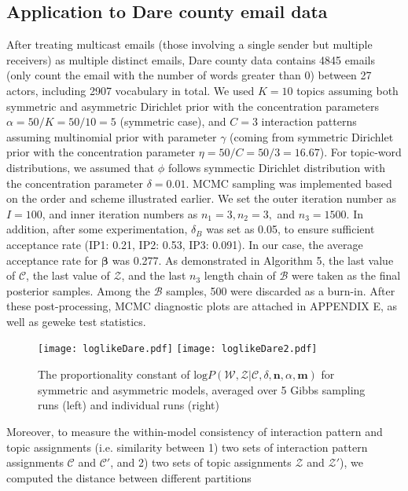 \documentclass[a4paper]{article}
\begin{document}
\subsection{Application to Dare county email data}
After treating multicast emails (those involving a single sender but multiple receivers) as multiple distinct emails, Dare county data contains 4845 emails (only count the email with the number of words greater than 0) between 27 actors, including 2907 vocabulary in total. We used $K=10$ topics assuming both symmetric and asymmetric Dirichlet prior with the concentration parameters $\alpha=50/K=50/10=5$ (symmetric case), and $C=3$ interaction patterns assuming multinomial prior with parameter $\gamma$ (coming from symmetric Dirichlet prior with the concentration parameter $\eta = 50/C=50/3=16.67$). For topic-word distributions, we assumed that $\phi$ follows symmectic Dirichlet distribution with the concentration parameter $\delta=0.01$. MCMC sampling was implemented based on the order and scheme illustrated earlier. We set the outer iteration number as $I=100$, and inner iteration numbers as $n_1=3, n_2=3,$ and $n_3=1500$. In addition, after some experimentation, $\delta_B$ was set as 0.05, to ensure sufficient acceptance rate (IP1: 0.21, IP2: 0.53, IP3: 0.091). In our case, the average acceptance rate for $\boldsymbol{\beta}$ was 0.277. As demonstrated in Algorithm 5, the last value of $\mathcal{C}$, the last value of $\mathcal{Z}$, and the last $n_3$ length chain of $\mathcal{B}$ were taken as the final posterior samples. Among the $\mathcal{B}$ samples, 500 were discarded as a burn-in. After these post-processing, MCMC diagnostic plots are attached in APPENDIX E, as well as geweke test statistics.
\begin{figure}[ht]
	\centering
	\texttt{[image: loglikeDare.pdf]} 
	\texttt{[image: loglikeDare2.pdf]} 
	\caption{The proportionality constant of $\mbox{log}P(\mathcal{W},\mathcal{Z}|\mathcal{C}, \delta, \boldsymbol{n}, \alpha, \boldsymbol{m})$ for symmetric and asymmetric models, averaged over 5 Gibbs sampling runs (left) and individual runs (right)}
	\label{fig:logPL1}
\end{figure}
\newline Moreover, to measure the within-model consistency of interaction pattern and topic assignments (i.e. similarity between 1) two sets of interaction pattern assignments $\mathcal{C}$ and $\mathcal{C'}$, and 2) two sets of topic
assignments $\mathcal{Z}$ and $\mathcal{Z'}$), we computed the distance between different partitions
\end{document}
